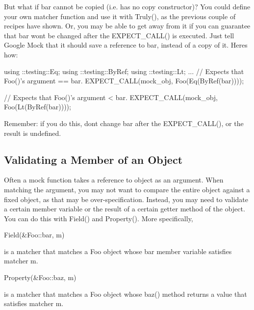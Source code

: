But what if {\ttfamily bar} cannot be copied (i.\+e. has no copy constructor)? You could define your own matcher function and use it with {\ttfamily Truly()}, as the previous couple of recipes have shown. Or, you may be able to get away from it if you can guarantee that {\ttfamily bar} won\textquotesingle{}t be changed after the {\ttfamily E\+X\+P\+E\+C\+T\+\_\+\+C\+A\+L\+L()} is executed. Just tell Google Mock that it should save a reference to {\ttfamily bar}, instead of a copy of it. Here\textquotesingle{}s how\+:


\begin{DoxyCode}
using ::testing::Eq;
using ::testing::ByRef;
using ::testing::Lt;
...
  \textcolor{comment}{// Expects that Foo()'s argument == bar.}
  EXPECT\_CALL(mock\_obj, Foo(Eq(ByRef(bar))));

  \textcolor{comment}{// Expects that Foo()'s argument < bar.}
  EXPECT\_CALL(mock\_obj, Foo(Lt(ByRef(bar))));
\end{DoxyCode}


Remember\+: if you do this, don\textquotesingle{}t change {\ttfamily bar} after the {\ttfamily E\+X\+P\+E\+C\+T\+\_\+\+C\+A\+L\+L()}, or the result is undefined.

\subsection*{Validating a Member of an Object}

Often a mock function takes a reference to object as an argument. When matching the argument, you may not want to compare the entire object against a fixed object, as that may be over-\/specification. Instead, you may need to validate a certain member variable or the result of a certain getter method of the object. You can do this with {\ttfamily Field()} and {\ttfamily Property()}. More specifically,


\begin{DoxyCode}
Field(&Foo::bar, m)
\end{DoxyCode}


is a matcher that matches a {\ttfamily Foo} object whose {\ttfamily bar} member variable satisfies matcher {\ttfamily m}.


\begin{DoxyCode}
Property(&Foo::baz, m)
\end{DoxyCode}


is a matcher that matches a {\ttfamily Foo} object whose {\ttfamily baz()} method returns a value that satisfies matcher {\ttfamily m}.

